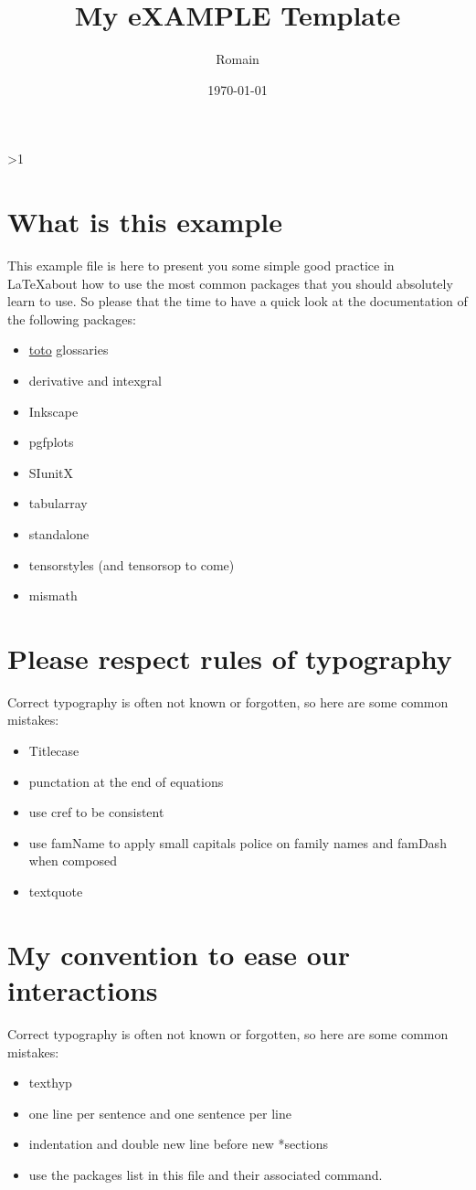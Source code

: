 \documentclass[a4paper]{article}  %
\title{My eXAMPLE Template}
\author{Romain \famName{Noël}}
\date{\today}
\begin{document}

\ifnum\value{levelstanda}>1
	{}%
\else
	\maketitle
\fi


\section{What is this example}
	This example file is here to present you some simple good practice in \LaTeX about how to use the most common packages that you should absolutely learn to use.
	So please that the time to have a quick look at the documentation of the following packages:
	\begin{itemize}
		\item \href{tes}{toto} glossaries
		\item derivative and intexgral
		\item Inkscape
		\item pgfplots
		\item SIunitX
		\item tabularray
		\item standalone
		\item tensorstyles (and tensorsop to come)
		\item mismath
	\end{itemize}


\section{Please respect rules of typography}
	Correct typography is often not known or forgotten, so here are some  common mistakes:
	\begin{itemize}
		\item Titlecase
		\item punctation at the end of equations
		\item use cref to be consistent
		\item use famName to apply small capitals police on family names and famDash when composed
		\item textquote
	\end{itemize}


\section{My convention to ease our interactions}
	Correct typography is often not known or forgotten, so here are some  common mistakes:
	\begin{itemize}
		\item texthyp
		\item one line per sentence and one sentence per line
		\item indentation and double new line before new *sections
		\item use the packages list in this file and their associated command.
	\end{itemize}
\end{document}
